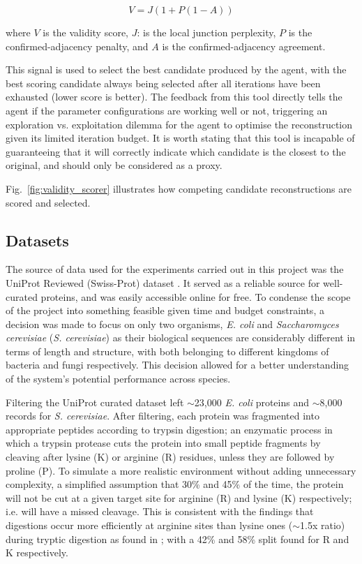 \documentclass[journal]{IEEEtran}
\begin{document}
\begin{equation}
V = J(1 + P(1-A))
\end{equation}

{\scriptsize
\noindent where $V$ is the validity score, $J$: is the local junction perplexity, $P$ is the confirmed-adjacency penalty, and $A$ is the confirmed-adjacency agreement.
\par\vspace{0.5em}}

This signal is used to select the
best candidate produced by the agent, with the best scoring candidate always being selected after all 
iterations have been exhausted (lower score is better). The feedback from this tool directly tells the agent if the parameter
configurations are working well or not, triggering an exploration vs. exploitation
dilemma for the agent to optimise the reconstruction given its limited iteration budget. It is worth stating that this tool is incapable of 
guaranteeing that it will correctly indicate which candidate is the closest to the original, and should only be considered
as a proxy.

Fig.~\ref{fig:validity_scorer} illustrates how competing candidate reconstructions are scored and selected.



\subsection{Datasets}
The source of data used for the experiments carried out in this project was the UniProt Reviewed (Swiss-Prot) dataset \cite{10.1093/nar/gkae1010}.
It served as a reliable source for well-curated proteins, and was easily accessible online for free.
To condense the scope of the project into something feasible given time and budget constraints, a decision was made to focus on only two organisms, \textit{E. coli} and \textit{Saccharomyces cerevisiae} (\textit{S. cerevisiae})
as their biological sequences are considerably different in terms of length and structure, with both belonging to different kingdoms of bacteria and fungi respectively. 
This decision allowed for a better understanding of the system's potential performance across species.

Filtering the UniProt curated dataset left $\sim$23,000 \textit{E. coli} proteins and
$\sim$8,000 records for \textit{S. cerevisiae}. After filtering, each protein was fragmented into appropriate
peptides according to trypsin digestion; an enzymatic process in which a trypsin protease
cuts the protein into small peptide fragments by cleaving after lysine (K)
or arginine (R) residues, unless they are followed by proline (P). To simulate
a more realistic environment without adding unnecessary complexity, a simplified assumption that 30\% and 45\% of the time, the protein
will not be cut at a given target site for arginine (R) and lysine (K) respectively; i.e. will have a missed cleavage.
This is consistent with the findings that digestions occur more efficiently at arginine sites than lysine ones ($\sim$1.5x ratio) during
tryptic digestion as found in \cite{siepen2007prediction}; with a 42\% and 58\% split found for R and K respectively.
\end{document}
